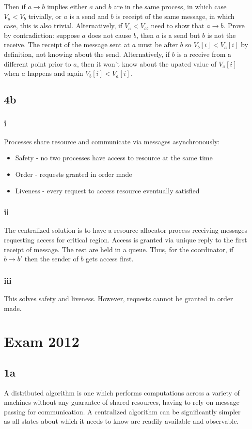 \documentclass[a4paper,10pt,]{report}
\begin{document}
Then if $a \rightarrow b$ implies either $a$ and $b$ are in the same process, in which case $V_a < V_b$ trivially, or $a$ is a send and $b$ is receipt of the same message, in which case, this is also trivial.  Alternatively, if $V_a < V_b$, need to show that $a \rightarrow b$.  Prove by contradiction: suppose $a$ does not cause $b$, then $a$ is a send but $b$ is not the receive.  The receipt of the message sent at $a$ must be after $b$ so $V_b[i] < V_a[i]$ by definition, not knowing about the send.  Alternatively, if $b$ is a receive from a different point prior to $a$, then it won't know about the upated value of $V_a[i]$ when $a$ happens and again $V_b[i] < V_a[i]$.

\section{4b}
\subsection{i}
Processes share resource and communicate via messages asynchronously:
\begin{itemize}
\item Safety - no two processes have access to resource at the same time
\item Order - requests granted in order made
\item Liveness - every request to access resource eventually satisfied
\end{itemize}
\subsection{ii}
The centralized solution is to have a resource allocator process receiving messages requesting access for critical region.  Access is granted via unique reply to the first receipt of message.  The rest are held in a queue.  Thus, for the coordinator, if $b\rightarrow b'$ then the sender of $b$ gets access first.
\subsection{iii}
This solves safety and liveness.  However, requests cannot be granted in order made.


\chapter{Exam 2012}

\section{1a}
A distributed algorithm is one which performs computations across a variety of machines without any guarantee of shared resources, having to rely on message passing for communication.  A centralized algorithm can be significantly simpler as all states about which it needs to know are readily available and observable.
\end{document}
